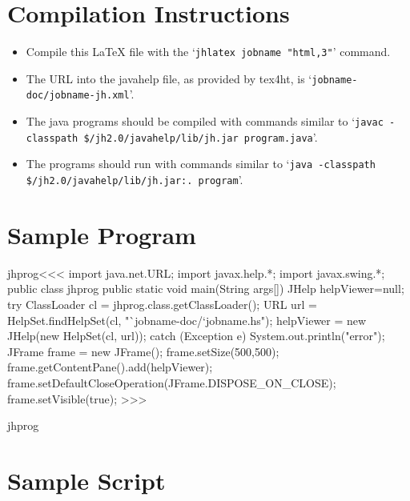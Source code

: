 \documentclass{article}
\begin{document}
\tableofcontents

\section{Compilation Instructions}

\begin{itemize}
\item
Compile this \LaTeX{} file with the
%
`{\tt jhlatex
jobname "html,3"}'
command.
\item
{}%
The URL into the javahelp file, as provided by tex4ht, is
`{\tt jobname-doc/jobname-jh.xml}'.
\item
The java programs should be compiled with commands  similar to
%
`{\tt javac -classpath
  \$/jh2.0/javahelp/lib/jh.jar program.java}'.
\item
The programs should run with commands similar to
%
`{\tt java -classpath
  \$/jh2.0/javahelp/lib/jh.jar:. program}'.
\end{itemize}




\section{Sample Program}

\<jhprog\><<<
import java.net.URL;
import javax.help.*;
import javax.swing.*;
public class jhprog {
   public static void main(String args[]) {
      JHelp helpViewer=null;
      try {
         ClassLoader cl = jhprog.class.getClassLoader();
         URL url = HelpSet.findHelpSet(cl,
                              "`jobname-doc/`jobname.hs");
         helpViewer = new JHelp(new HelpSet(cl, url));
      } catch (Exception e) { System.out.println("error");
      }
      JFrame frame = new JFrame();
      frame.setSize(500,500);
      frame.getContentPane().add(helpViewer);
      frame.setDefaultCloseOperation(JFrame.DISPOSE_ON_CLOSE);
      frame.setVisible(true);
   }
}
>>>

\OutputCode\<jhprog\>


\section{Sample Script}
\end{document}
